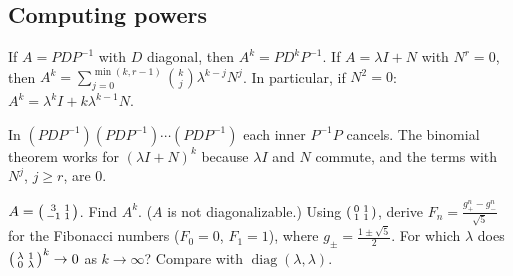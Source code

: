 \documentclass[10pt]{scrartcl}
\begin{document}
\subsection{Computing powers}
\begin{theorem*}[T9]
  If $A=PDP^{-1}$ with $D$ diagonal, then $A^k=PD^kP^{-1}$. If $A=\lambda I+N$ with $N^r=0$, then $A^k=\sum_{j=0}^{\min(k,r-1)}\binom kj\lambda^{k-j}N^j$. In particular, if $N^2=0$: $A^k=\lambda^kI+k\lambda^{k-1}N$.
\end{theorem*}
\why In $(PDP^{-1})(PDP^{-1})\cdots(PDP^{-1})$ each inner $P^{-1}P$ cancels. The binomial theorem works for $(\lambda I+N)^k$ because $\lambda I$ and $N$ commute, and the terms with $N^j$, $j\ge r$, are $0$.
\probs
\begin{enumerate}[(a)]
  \ii $A=\begin{psmallmatrix}3&1\\-1&1\end{psmallmatrix}$. Find $A^k$. ($A$ is not diagonalizable.)
  \ii Using $\begin{psmallmatrix}0&1\\1&1\end{psmallmatrix}$, derive $F_n=\frac{g_+^n-g_-^n}{\sqrt5}$ for the Fibonacci numbers ($F_0=0$, $F_1=1$), where $g_\pm=\frac{1\pm\sqrt5}2$.
  \ii For which $\lambda$ does $\begin{psmallmatrix}\lambda&1\\0&\lambda\end{psmallmatrix}^k\to0$ as $k\to\infty$? Compare with $\operatorname{diag}(\lambda,\lambda)$.
\end{enumerate}
\end{document}
